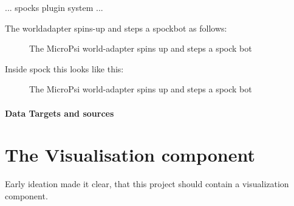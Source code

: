 

... spocks plugin system ...

The worldadapter spins-up and steps a spockbot as follows:

\begin{figure}[ht]
			\centering
			\begin{minipage}{11cm}
				\caption{The MicroPsi world-adapter spins up and steps a spock bot}
				\label{snippet_position-packet}
			\end{minipage}
		\end{figure}
		
Inside spock this looks like this:

\begin{figure}[ht]
			\centering
			\begin{minipage}{11cm}
				\begin{pseudocode}

				\end{pseudocode}
				\caption{The MicroPsi world-adapter spins up and steps a spock bot}
				\label{snippet_position-packet}
			\end{minipage}
		\end{figure}

\paragraph{Data Targets and sources}


    \section{The Visualisation component}
Early ideation made it clear, that this project should contain a visualization component. 

